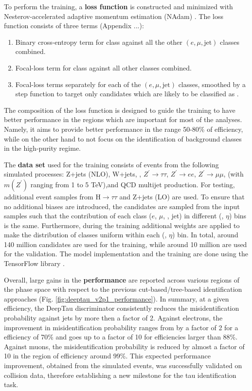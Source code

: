 To perform the training, a \textbf{loss function} is constructed and minimized with Nesterov-accelerated adaptive momentum estimation (NAdam) \cite{dozat2016incorporating}. The loss function consists of three terms (Appendix ...):
\begin{enumerate}
    \item Binary cross-entropy term for \tauh class against all the other $(e, \mu, \text{jet})$ classes combined.
    \item Focal-loss \cite{lin2017focal} term for \tauh class against all other classes combined.
    \item Focal-loss terms separately for each of the $(e, \mu, \text{jet})$ classes, smoothed by a step function to target only \tauh candidates which are likely to be classified as \tauh.
\end{enumerate}
The composition of the loss function is designed to guide the training to have better performance in the regions which are important for most of the analyses. Namely, it aims to provide better performance in the range 50-80\% of \tauh efficiency, while on the other hand to not focus on the identification of background classes in the high-purity regime.   

The \textbf{data set} used for the training consists of events from the following simulated processes: Z+jets (NLO), W+jets, \ttbar, $Z^{'} \to \tau \tau$, $Z^{'} \to ee$, $Z^{'} \to \mu \mu$, (with $m(Z^{'})$ ranging from 1 to 5 TeV),and QCD multijet production. For testing, additional event samples from $\text{H} \to \tau\tau$ and Z+jets (LO) are used. To ensure that no additional biases are introduced, the \tauh candidates are sampled from the input samples such that the contribution of each class ($e$, $\mu$, \tauh, jet) in different (\pt, $\eta$) bins is the same. Furthermore, during the training additional weights are applied to make the distribution of classes uniform within each (\pt, $\eta$) bin. In total, around 140 million \tauh candidates are used for the training, while around 10 million are used for the validation. The model implementation and the training are done using the TensorFlow library \cite{tensorflow2015-whitepaper}. 

Overall, large gains in the \textbf{performance} are reported across various regions of the phase space with respect to the previous cut-based/tree-based \tauh identification approaches (Fig. \ref{fig:deeptau_v2p1_performance}). In summary, at a given \tauh efficiency, the DeepTau discriminator consistently reduces the misidentification probability against jets by more then a factor of 2. Against electrons, the improvement in misidentification probability ranges from by a factor of 2 for a \tauh efficiency of 70\% and goes up to a factor of 10 for \tauh efficiencies larger than 88\%. Against muons, the misidentification probability is reduced by almost a factor of 10 in the region of \tauh efficiency around 99\%. This expected performance improvement, obtained from the simulated events, was successfully validated on collision data, therefore establishing a new milestone for the tau identification task. 

